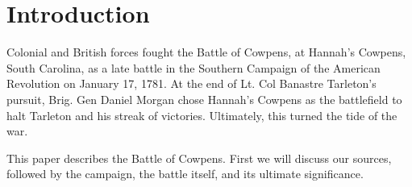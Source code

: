 \section{Introduction}



Colonial and British forces fought the Battle of Cowpens, at Hannah's Cowpens,
South Carolina, as a late battle in the Southern Campaign of the American
Revolution on January 17, 1781. At the end of Lt. Col Banastre Tarleton's
pursuit, Brig. Gen Daniel Morgan chose Hannah's Cowpens as the
battlefield to halt Tarleton and his streak of victories. Ultimately, this
turned the tide of the war.

This paper describes the Battle of Cowpens. First we will discuss our sources, followed
by the campaign, the battle itself, and its ultimate significance.








